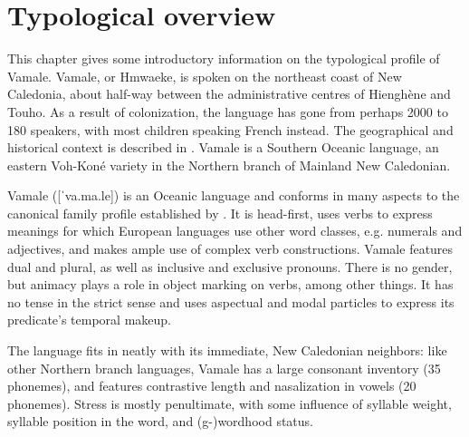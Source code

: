 \chapter{Typological overview} %

This chapter gives some introductory information on the typological profile of Vamale. %
Vamale, or Hmwaeke, is spoken on the northeast coast of New Caledonia, about half-way between the administrative centres of Hienghène and Touho. As a result of colonization, the language has gone from perhaps 2000 to 180 speakers, with most children speaking French instead. The geographical and historical context is described in . Vamale is a Southern Oceanic language, an eastern Voh-Koné variety in the Northern branch of Mainland New Caledonian.

Vamale ([ˈva.ma.le]) is an Oceanic language and conforms in many aspects to the canonical family profile established by \textcite{ross_morphosyntactic_2004}. It is head-first, uses verbs to express meanings for which European languages use other word classes, e.g. numerals and adjectives, and makes ample use of complex verb constructions. Vamale features dual and plural, as well as inclusive and exclusive pronouns. There is no gender, but animacy plays a role in object marking on verbs, among other things. It has no tense in the strict sense and uses aspectual and modal particles to express its predicate's temporal makeup. 

The language fits in neatly with its immediate, New Caledonian neighbors: like other Northern branch languages, Vamale has a large consonant inventory (35 phonemes), and features contrastive length and nasalization in vowels (20 phonemes). %
Stress is mostly penultimate, with some influence of syllable weight, syllable position in the word, and (g-)wordhood status. %

